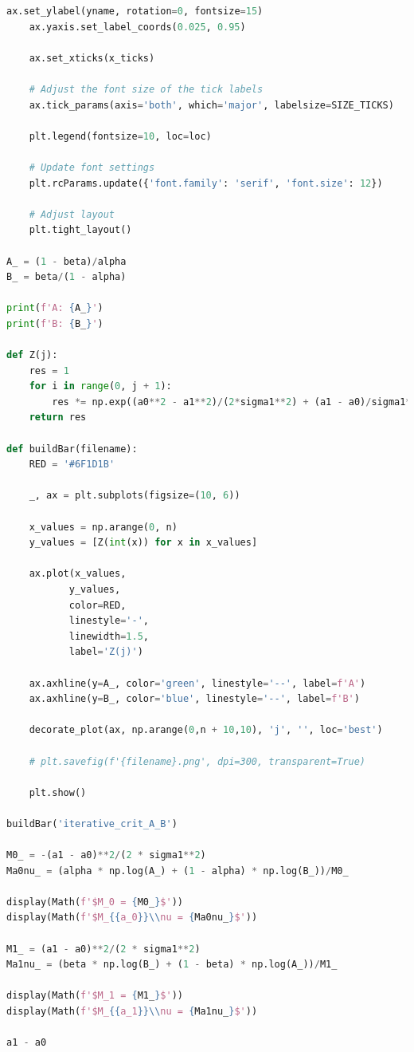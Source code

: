 \documentclass[a4paper, 14pt]{extarticle}
\begin{document}
\begin{center}
\begin{lstlisting}[language=Python]
    ax.set_ylabel(yname, rotation=0, fontsize=15)
    ax.yaxis.set_label_coords(0.025, 0.95)

    ax.set_xticks(x_ticks)

    # Adjust the font size of the tick labels
    ax.tick_params(axis='both', which='major', labelsize=SIZE_TICKS)

    plt.legend(fontsize=10, loc=loc)

    # Update font settings
    plt.rcParams.update({'font.family': 'serif', 'font.size': 12})

    # Adjust layout
    plt.tight_layout()

A_ = (1 - beta)/alpha
B_ = beta/(1 - alpha)

print(f'A: {A_}')
print(f'B: {B_}')

def Z(j):
    res = 1
    for i in range(0, j + 1):
        res *= np.exp((a0**2 - a1**2)/(2*sigma1**2) + (a1 - a0)/sigma1**2 * data_[i])
    return res

def buildBar(filename):
    RED = '#6F1D1B'

    _, ax = plt.subplots(figsize=(10, 6))

    x_values = np.arange(0, n)
    y_values = [Z(int(x)) for x in x_values]

    ax.plot(x_values, 
           y_values, 
           color=RED, 
           linestyle='-', 
           linewidth=1.5,
           label='Z(j)')
    
    ax.axhline(y=A_, color='green', linestyle='--', label=f'A')
    ax.axhline(y=B_, color='blue', linestyle='--', label=f'B')

    decorate_plot(ax, np.arange(0,n + 10,10), 'j', '', loc='best')

    # plt.savefig(f'{filename}.png', dpi=300, transparent=True)

    plt.show()

buildBar('iterative_crit_A_B')

M0_ = -(a1 - a0)**2/(2 * sigma1**2)
Ma0nu_ = (alpha * np.log(A_) + (1 - alpha) * np.log(B_))/M0_

display(Math(f'$M_0 = {M0_}$'))
display(Math(f'$M_{{a_0}}\\nu = {Ma0nu_}$'))

M1_ = (a1 - a0)**2/(2 * sigma1**2)
Ma1nu_ = (beta * np.log(B_) + (1 - beta) * np.log(A_))/M1_

display(Math(f'$M_1 = {M1_}$'))
display(Math(f'$M_{{a_1}}\\nu = {Ma1nu_}$'))

a1 - a0


\end{lstlisting}
\end{center}
\end{document}
